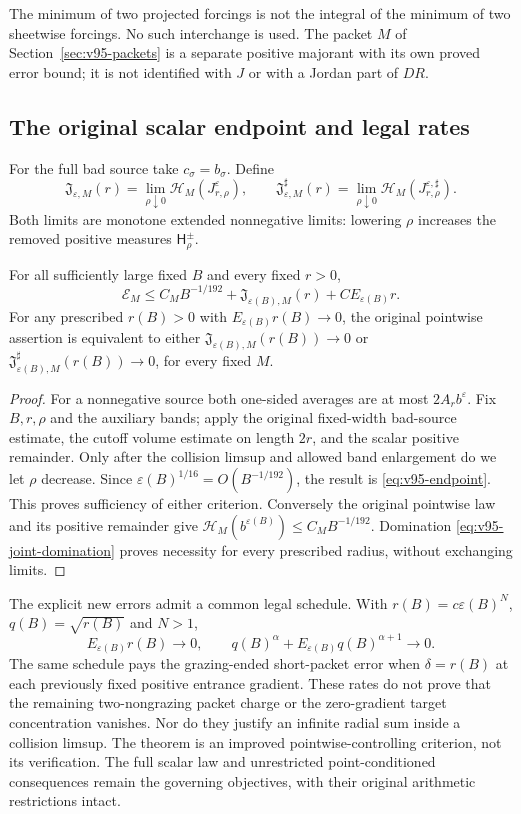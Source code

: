 The minimum of two projected forcings is not the integral of the
minimum of two sheetwise forcings. No such interchange is used.
The packet $M$ of Section~\ref{sec:v95-packets} is a separate positive
majorant with its own proved error bound; it is not identified with
$J$ or with a Jordan part of $DR$.

\subsection{The original scalar endpoint and legal rates}
For the full bad source take $c_\sigma=b_\sigma$. Define
\[
 \mathfrak J_{\varepsilon,M}(r)
   =\lim_{\rho\downarrow0}\mathcal H_M(J_{r,\rho}^\varepsilon),
 \qquad
 \mathfrak J_{\varepsilon,M}^{\sharp}(r)
   =\lim_{\rho\downarrow0}\mathcal H_M(J_{r,\rho}^{\varepsilon,\sharp}).
\]
Both limits are monotone extended nonnegative limits: lowering $\rho$
increases the removed positive measures $\mathsf H_\rho^\pm$.

\begin{theorem}
\label{thm:v95-endpoint}
For all sufficiently large fixed $B$ and every fixed $r>0$,
\begin{equation}\label{eq:v95-endpoint}
 \mathcal E_M\le C_MB^{-1/192}
 +\mathfrak J_{\varepsilon(B),M}(r)
 +C E_{\varepsilon(B)}r.
\end{equation}
For any prescribed $r(B)>0$ with $E_{\varepsilon(B)}r(B)\to0$,
the original pointwise assertion is equivalent to either
$\mathfrak J_{\varepsilon(B),M}(r(B))\to0$ or
$\mathfrak J_{\varepsilon(B),M}^{\sharp}(r(B))\to0$, for every fixed $M$.
\end{theorem}
\begin{proof}
For a nonnegative source both one-sided averages are at most
$2A_rb^\varepsilon$. Fix $B,r,\rho$ and the auxiliary bands;
apply the original fixed-width bad-source estimate, the cutoff
volume estimate on length $2r$, and the scalar positive remainder.
Only after the collision limsup and allowed band enlargement do we
let $\rho$ decrease. Since
$\varepsilon(B)^{1/16}=O(B^{-1/192})$, the result is
\eqref{eq:v95-endpoint}. This proves sufficiency of either criterion.
Conversely the original pointwise law and its positive remainder give
$\mathcal H_M(b^{\varepsilon(B)})\le C_MB^{-1/192}$.
Domination \eqref{eq:v95-joint-domination} proves necessity for every
prescribed radius, without exchanging limits.
\end{proof}

The explicit new errors admit a common legal schedule. With
$r(B)=c\varepsilon(B)^N$, $q(B)=\sqrt{r(B)}$ and $N>1$,
\[
 E_{\varepsilon(B)}r(B)\to0,\qquad
 q(B)^\alpha+E_{\varepsilon(B)}q(B)^{\alpha+1}\to0.
\]
The same schedule pays the grazing-ended short-packet error when
$\delta=r(B)$ at each previously fixed positive entrance gradient.
These rates do not prove that the remaining two-nongrazing packet
charge or the zero-gradient target concentration vanishes. Nor do they
justify an infinite radial sum inside a collision limsup. The theorem
is an improved pointwise-controlling criterion, not its verification.
The full scalar law and unrestricted point-conditioned consequences
remain the governing objectives, with their original arithmetic
restrictions intact.
